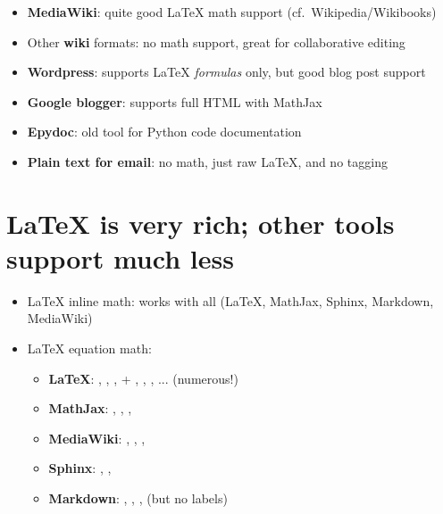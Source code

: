 \documentclass[%
twoside,                 %
draft,                   %
final,                   %
chapterprefix=true,      %
open=right               %
10pt]{book}
\begin{document}
\begin{shadedquoteBlue}
\begin{itemize}
 \item \textbf{MediaWiki}: quite good {\LaTeX} math support (cf.~Wikipedia/Wikibooks)

 \item Other \textbf{wiki} formats: no math support, great for collaborative editing

 \item \textbf{Wordpress}: supports {\LaTeX} \emph{formulas} only, but good blog post support

 \item \textbf{Google blogger}: supports full HTML with MathJax

 \item \textbf{Epydoc}: old tool for Python code documentation

 \item \textbf{Plain text for email}: no math, just raw {\LaTeX}, and no tagging
\end{itemize}

\noindent


\section*{{\LaTeX} is very rich; other tools support much less}

\begin{itemize}
 \item {\LaTeX} inline math: works with all ({\LaTeX}, MathJax, Sphinx, Markdown, MediaWiki)

 \item {\LaTeX} equation math:
\begin{itemize}

    \item \textbf{LaTeX}: , , ,  +
      , , , ... (numerous!)

    \item \textbf{MathJax}: , , , 

    \item \textbf{MediaWiki}: , , , 

    \item \textbf{Sphinx}: , , 

    \item \textbf{Markdown}: , , ,  (but no labels)
\end{itemize}


\end{itemize}
\end{shadedquoteBlue}
\end{document}
